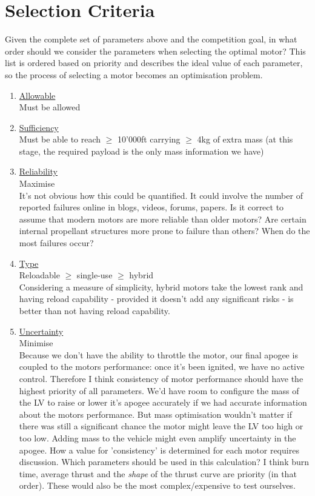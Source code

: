 \documentclass[11pt,table]{article}
\begin{document}
\section*{Selection Criteria}
Given the complete set of parameters above and the competition goal, in what order should we consider the parameters when
selecting the optimal motor? This list is ordered based on priority and describes the ideal value of each parameter, so
the process of selecting a motor becomes an optimisation problem.

\begin{enumerate}
    \item \underline{Allowable} \\
	Must be allowed
    
    \item \underline{Sufficiency} \\
	Must be able to reach $\geq$ 10'000ft carrying $\geq$ 4kg of extra mass (at this stage, the required payload is the
	only mass information we have)
    
    \item \underline{Reliability} \\
    Maximise \\
	It's not obvious how this could be quantified. It could involve the number of reported failures online in blogs,
	videos, forums, papers. Is it correct to assume that modern motors are more reliable than older motors? Are certain
	internal propellant structures more prone to failure than others? When do the most failures occur?
    
    \item \underline{Type} \\
    Reloadable $\geq$ single-use $\geq$ hybrid \\
	Considering a measure of simplicity, hybrid motors take the lowest rank and having reload capability - provided it
	doesn't add any significant risks - is better than not having reload capability.
    
    \item \underline{Uncertainty} \\
    Minimise \\
	Because we don't have the ability to throttle the motor, our final apogee is coupled to the motors performance: once
	it's been ignited, we have no active control. Therefore I think consistency of motor performance should have the
	highest priority of all parameters. We'd have room to configure the mass of the LV to raise or lower it's apogee
	accurately if we had accurate information about the motors performance. But mass optimisation wouldn't matter if
	there was still a significant chance the motor might leave the LV too high or too low. Adding mass to the vehicle
	might even amplify uncertainty in the apogee. How a value for 'consistency' is determined for each motor requires
	discussion. Which parameters should be used in this calculation? I think burn time, average thrust and the
	\textit{shape} of the thrust curve are priority (in that order). These would also be the most complex/expensive to
	test ourselves.
    

\end{enumerate}
\end{document}

